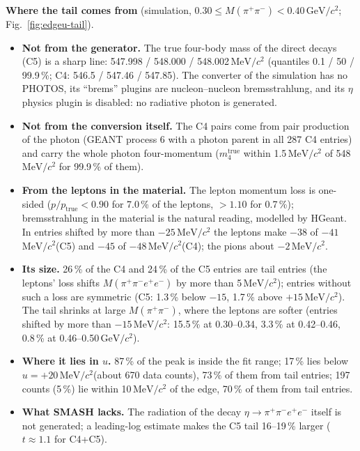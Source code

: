 \documentclass[11pt,a4paper]{article}
\newcommand{\ppee}{\ensuremath{\pi^{+}\pi^{-}e^{+}e^{-}}\xspace}
\newcommand{\Mfour}{\ensuremath{M(\pi^{+}\pi^{-}e^{+}e^{-})}\xspace}
\newcommand{\Mpipi}{\ensuremath{M(\pi^{+}\pi^{-})}\xspace}
\newcommand{\GeVcc}{\ensuremath{\mathrm{GeV}/c^{2}}\xspace}
\newcommand{\MeVcc}{\ensuremath{\mathrm{MeV}/c^{2}}\xspace}
\begin{document}
\textbf{Where the tail comes from} (simulation, $0.30\le\Mpipi<0.40$\,\GeVcc; Fig.~\ref{fig:edgeu-tail}).
\begin{itemize}\setlength{\itemsep}{1pt}
\item \textbf{Not from the generator.} The true four-body mass of the direct decays (C5) is a sharp line: 547.998 / 548.000 / 548.002\,\MeVcc
      (quantiles 0.1 / 50 / 99.9\,\%; C4: 546.5 / 547.46 / 547.85). The converter of the simulation has no PHOTOS, its ``brems'' plugins are
      nucleon--nucleon bremsstrahlung, and its $\eta$ physics plugin is disabled: no radiative photon is generated.
\item \textbf{Not from the conversion itself.} The C4 pairs come from pair production of the photon (GEANT process 6 with a photon parent in all
      287 C4 entries) and carry the whole photon four-momentum ($m_4^{\mathrm{true}}$ within 1.5\,\MeVcc of 548\,\MeVcc for 99.9\,\% of them).
\item \textbf{From the leptons in the material.} The lepton momentum loss is one-sided ($p/p_{\mathrm{true}}<0.90$ for 7.0\,\% of the leptons,
      $>1.10$ for 0.7\,\%); bremsstrahlung in the material is the natural reading, modelled by HGeant. In entries shifted by more than $-25$\,\MeVcc
      the leptons make $-38$ of $-41$\,\MeVcc (C5) and $-45$ of $-48$\,\MeVcc (C4); the pions about $-2$\,\MeVcc.
\item \textbf{Its size.} 26\,\% of the C4 and 24\,\% of the C5 entries are tail entries (the leptons' loss shifts \Mfour by more than 5\,\MeVcc);
      entries without such a loss are symmetric (C5: 1.3\,\% below $-15$, 1.7\,\% above $+15$\,\MeVcc). The tail shrinks at large \Mpipi, where the
      leptons are softer (entries shifted by more than $-15$\,\MeVcc: 15.5\,\% at 0.30--0.34, 3.3\,\% at 0.42--0.46, 0.8\,\% at 0.46--0.50\,\GeVcc).
\item \textbf{Where it lies in $u$.} 87\,\% of the peak is inside the fit range; 17\,\% lies below $u=+20$\,\MeVcc (about 670 data counts), 73\,\% of
      them from tail entries; 197 counts (5\,\%) lie within 10\,\MeVcc of the edge, 70\,\% of them from tail entries.
\item \textbf{What SMASH lacks.} The radiation of the decay $\eta\to\ppee$ itself is not generated; a leading-log estimate makes the C5 tail
      16--19\,\% larger ($t\approx1.1$ for C4+C5).
\end{itemize}
\end{document}

